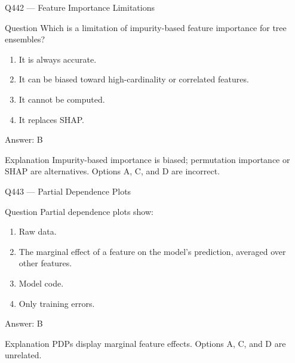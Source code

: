 \documentclass[aspectratio=169,8pt]{beamer}
\begin{document}
	\begin{frame}{Q442 --- Feature Importance Limitations}
		\begin{block}{Question}
			Which is a limitation of impurity-based feature importance for tree ensembles?
			\begin{enumerate}
				\item It is always accurate.
				\item It can be biased toward high-cardinality or correlated features.
				\item It cannot be computed.
				\item It replaces SHAP.
			\end{enumerate}
		\end{block}
		\begin{exampleblock}{Answer: B}\end{exampleblock}
		\begin{block}{Explanation}
			Impurity-based importance is biased; permutation importance or SHAP are alternatives. Options A, C, and D are incorrect.
		\end{block}
	\end{frame}
	
	\begin{frame}{Q443 --- Partial Dependence Plots}
		\begin{block}{Question}
			Partial dependence plots show:
			\begin{enumerate}
				\item Raw data.
				\item The marginal effect of a feature on the model's prediction, averaged over other features.
				\item Model code.
				\item Only training errors.
			\end{enumerate}
		\end{block}
		\begin{exampleblock}{Answer: B}\end{exampleblock}
		\begin{block}{Explanation}
			PDPs display marginal feature effects. Options A, C, and D are unrelated.
		\end{block}
	\end{frame}
	
\end{document}
